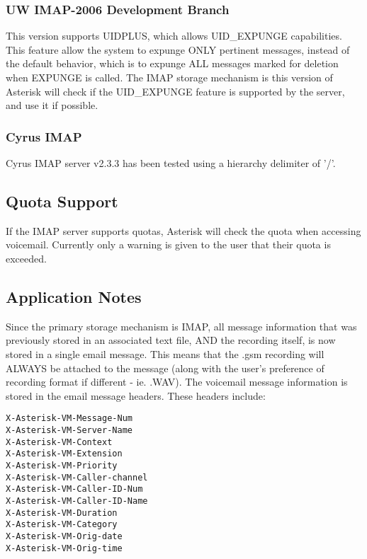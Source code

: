 \subsubsection{UW IMAP-2006 Development Branch}

This version supports UIDPLUS, which allows UID\_EXPUNGE capabilities.  This
feature allow the system to expunge ONLY pertinent messages, instead of the
default behavior, which is to expunge ALL messages marked for deletion when
EXPUNGE is called.  The IMAP storage mechanism is this version of Asterisk
will check if the UID\_EXPUNGE feature is supported by the server, and use it
if possible. 

\subsubsection{Cyrus IMAP}

Cyrus IMAP server v2.3.3 has been tested using a hierarchy delimiter of '/'.  


\subsection{Quota Support}

If the IMAP server supports quotas, Asterisk will check the quota when
accessing voicemail.  Currently only a warning is given to the user that 
their quota is exceeded. 


\subsection{Application Notes}

Since the primary storage mechanism is IMAP, all message information that 
was previously stored in an associated text file, AND the recording itself,
is now stored in a single email message.  This means that the .gsm recording
will ALWAYS be attached to the message (along with the user's preference of
recording format if different - ie. .WAV).  The voicemail message information
is stored in the email message headers.  These headers include:

\begin{verbatim}
X-Asterisk-VM-Message-Num
X-Asterisk-VM-Server-Name
X-Asterisk-VM-Context
X-Asterisk-VM-Extension
X-Asterisk-VM-Priority
X-Asterisk-VM-Caller-channel
X-Asterisk-VM-Caller-ID-Num
X-Asterisk-VM-Caller-ID-Name
X-Asterisk-VM-Duration
X-Asterisk-VM-Category
X-Asterisk-VM-Orig-date
X-Asterisk-VM-Orig-time
\end{verbatim}
